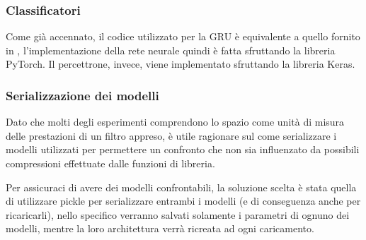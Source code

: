 \documentclass[../../main.tex]{subfiles}
\begin{document}
    \subsubsection{Classificatori}
    Come già accennato, il codice utilizzato per la GRU è equivalente a quello fornito in \cite{ma2020}, l'implementazione della rete neurale quindi è fatta sfruttando la libreria PyTorch. Il percettrone, invece, viene implementato sfruttando la libreria Keras.

    \subsubsection{Serializzazione dei modelli}
    Dato che molti degli esperimenti comprendono lo spazio come unità di misura delle prestazioni di un filtro appreso, è utile ragionare sul come serializzare i modelli utilizzati per permettere un confronto che non sia influenzato da possibili compressioni effettuate dalle funzioni di libreria.

    Per assicuraci di avere dei modelli confrontabili, la soluzione scelta è stata quella di utilizzare pickle per serializzare entrambi i modelli (e di conseguenza anche per ricaricarli), nello specifico verranno salvati solamente i parametri di ognuno dei modelli, mentre la loro architettura verrà ricreata ad ogni caricamento.
    
\end{document}

